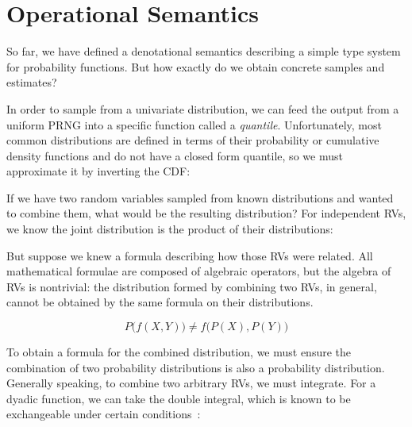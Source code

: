 \documentclass{article}
\begin{document}
%
%

\section{Operational Semantics}

So far, we have defined a denotational semantics describing a simple type system for probability functions. But how exactly do we obtain concrete samples and estimates?

In order to sample from a univariate distribution, we can feed the output from a uniform PRNG into a specific function called a \textit{quantile}. Unfortunately, most common distributions are defined in terms of their probability or cumulative density functions and do not have a closed form quantile, so we must approximate it by inverting the CDF:


\begin{prooftree}
\end{prooftree}

If we have two random variables sampled from known distributions and wanted to combine them, what would be the resulting distribution? For independent RVs, we know the joint distribution is the product of their distributions:


\begin{prooftree}
\end{prooftree}

But suppose we knew a formula describing how those RVs were related. All mathematical formulae are composed of algebraic operators, but the algebra of RVs is nontrivial: the distribution formed by combining two RVs, in general, cannot be obtained by the same formula on their distributions.

$$P\big(f(X, Y)\big) \neq f\big(P(X), P(Y)\big)$$

To obtain a formula for the combined distribution, we must ensure the combination of two probability distributions is also a probability distribution. Generally speaking, to combine two arbitrary RVs, we must integrate. For a dyadic function, we can take the double integral, which is known to be exchangeable under certain conditions~\citep{fubini1907sugli}:
\end{document}
